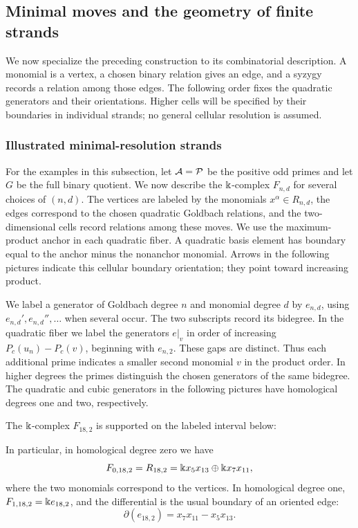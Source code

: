 \subsection{Minimal moves and the geometry of finite strands}
\label{sec:examples}
We now specialize the preceding construction to its combinatorial
description. A monomial is a vertex, a chosen binary relation gives
an edge, and a syzygy records a relation among those edges. The
following order fixes the quadratic generators and their orientations.
Higher cells will be specified by their boundaries in individual
strands; no general cellular resolution is assumed.


\subsubsection{Illustrated minimal-resolution strands}
For the examples in this subsection, let $\mathcal A=\mathcal P$ be the positive
odd primes and let $G$ be the full binary quotient. We now describe
the $\Bbbk$-complex $F_{n,d}$ for several choices of
$(n,d)$. The vertices are labeled by the monomials $x^\alpha\in R_{n,d}$,
the edges correspond to the chosen quadratic Goldbach relations,
and the two-dimensional cells record relations among these moves.
We use the maximum-product anchor in each quadratic fiber. A
quadratic basis element has boundary equal to the anchor
minus the nonanchor monomial. Arrows in the following pictures indicate this
cellular boundary orientation; they point toward increasing product.

We label a generator of Goldbach degree $n$ and monomial degree $d$
by $e_{n,d}$, using $e_{n,d}',e_{n,d}'',\ldots$ when several occur.
The two subscripts record its bidegree. In the quadratic fiber we
label the generators $\left.e\right|_v$ in order of increasing
$P_c(u_n)-P_c(v)$, beginning with $e_{n,2}$. These gaps are distinct.
Thus each additional prime indicates a smaller second monomial $v$
in the product order. In higher degrees the primes distinguish the
chosen generators of the same bidegree.
The quadratic and cubic generators in the following pictures have
homological degrees one and two, respectively.

\begin{example}\label{ex:original18}
The $\Bbbk$-complex $F_{18,2}$ is supported on the labeled interval below:
\begin{center}
\end{center}
In particular, in homological degree zero we have
\[
 F_{0,18,2}=R_{18,2}
 =\Bbbk x_5x_{13}\oplus\Bbbk x_7x_{11},
\]
where the two monomials correspond to the vertices. In homological
degree one, $F_{1,18,2}=\Bbbk e_{18,2}$, and the differential is the
usual boundary of an oriented edge:
\[
 \partial(e_{18,2})=x_7x_{11}-x_5x_{13}.
\]
\end{example}

